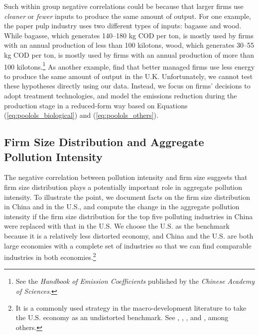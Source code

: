 \documentclass[AEJ]{AEA}
\begin{document}
Such within group negative correlations could be because that larger firms use \textit{cleaner} or \textit{fewer} inputs to produce the same amount of output. For one example, the paper pulp industry uses two different types of inputs: bagasse and wood. While bagasse, which generates 140--180 kg COD per ton, is mostly used by firms with an annual production of less than 100 kilotons, wood, which generates 30--55 kg COD per ton, is mostly used by firms with an annual production of more than 100 kilotons.\footnote{See the \textit{Handbook of Emission Coefficients} published by the \textit{Chinese Academy of Sciences}.} As another example, \citet{Bloometal:2010} find that better managed firms use less energy to produce the same amount of output in the U.K. Unfortunately, we cannot test these hypotheses directly using our data. Instead, we focus on firms' decisions to adopt treatment technologies, and model the emissions reduction during the production stage in a reduced-form way based on Equations (\ref{eq:poolols_biological}) and (\ref{eq:poolols_others}).

\subsection{Firm Size Distribution and Aggregate Pollution Intensity}

The negative correlation between pollution intensity and firm size suggests that firm size distribution plays a potentially important role in aggregate pollution intensity. To illustrate the point, we document facts on the firm size distribution in China and in the U.S., and compute the change in the aggregate pollution intensity if the firm size distribution for the top five polluting industries in China were replaced with that in the U.S. We choose the U.S. as the benchmark because it is a relatively less distorted economy, and China and the U.S. are both large economies with a complete set of industries so that we can find comparable industries in both economies.\footnote{It is a commonly used strategy in the macro-development literature to take the U.S. economy as an undistorted benchmark. See \citet{Guneretal:2008}, \citet{HsiehKlenow:2009, HsiehKlenow:2014}, \citet{Bartelsmanetal:2013}, and \citet{AdamopoulosRestuccia:2014}, among others.}
\end{document}
